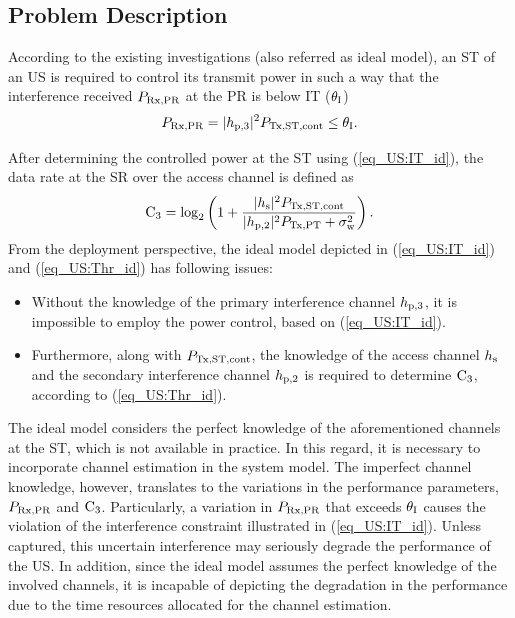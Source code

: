 \subsection{Problem Description} \label{ssec_US:pd}
According to the existing investigations (also referred as ideal model), an ST of an US is required to control its transmit power in such a way that the interference received $P_{\text{Rx,PR}}$ at the PR is below IT ($\theta_{\text{I}}$) \cite{Xing07}
\begin{equation}
P_{\text{Rx,PR}} = |h_{\text{p,3}}|^2 P_{\text{Tx,ST,cont}} \le \theta_{\text{I}}.
\label{eq_US:IT_id}
\end{equation}

After determining the controlled power at the ST using (\ref{eq_US:IT_id}), the data rate at the SR over the access channel is defined as
\begin{equation}
\text{C}_{\text{3}} = \log_2 \left(1 + \frac{|h_{\text{s}}|^2 P_{\text{Tx,ST,cont}}}{ |h_{\text{p,2}}|^2 P_{\text{Tx,PT}} + \sigma^2_{\text{w}}} \right). 
\label{eq_US:Thr_id}
\end{equation}
From the deployment perspective, the ideal model depicted in (\ref{eq_US:IT_id}) and (\ref{eq_US:Thr_id}) has following issues:
\begin{itemize}
\item Without the knowledge of the primary interference channel $h_{\text{p,3}}$, it is impossible to employ the power control, based on (\ref{eq_US:IT_id}). 
\item Furthermore, along with $P_{\text{Tx,ST,cont}}$, the knowledge of the access channel $h_{\text{s}}$ and the secondary interference channel $h_{\text{p,2}}$ is required to determine $\text{C}_{\text{3}}$, according to (\ref{eq_US:Thr_id}).
\end{itemize}
The ideal model considers the perfect knowledge of the aforementioned channels at the ST, which is not available in practice. In this regard, it is necessary to incorporate channel estimation in the system model. The imperfect channel knowledge, however, translates to the variations in the performance parameters, $P_{\text{Rx,PR}}$ and $\text{C}_{\text{3}}$. Particularly, a variation in $P_{\text{Rx,PR}}$ that exceeds $\theta_{\text{I}}$ causes the violation of the interference constraint illustrated in (\ref{eq_US:IT_id}). Unless captured, this uncertain interference may seriously degrade the performance of the US. In addition, since the ideal model assumes the perfect knowledge of the involved channels, it is incapable of depicting the degradation in the performance due to the time resources allocated for the channel estimation. %

